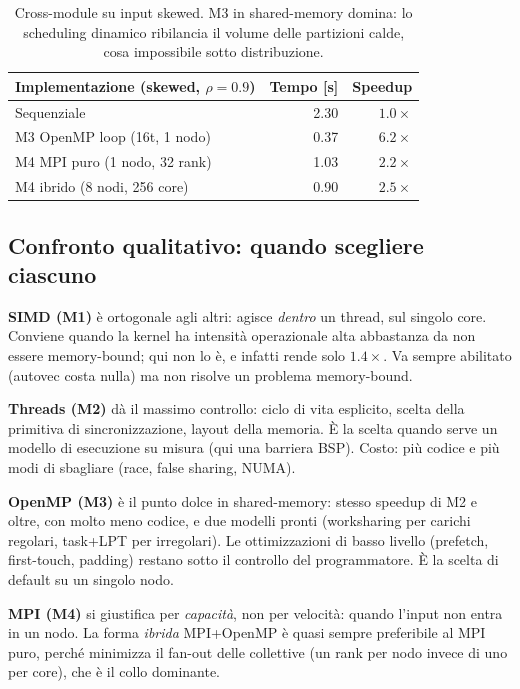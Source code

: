 \documentclass[11pt,a4paper]{article}
\theoremstyle{remark}
\begin{document}
\begin{table}[H]
\centering\small
\begin{tabular}{@{}lrr@{}}
\toprule
Implementazione (skewed, $\rho{=}0.9$) & Tempo [s] & Speedup \\
\midrule
Sequenziale                      & 2.30 & $1.0\times$ \\
M3 OpenMP loop (16t, 1 nodo)     & 0.37 & $6.2\times$ \\
M4 MPI puro (1 nodo, 32 rank)    & 1.03 & $2.2\times$ \\
M4 ibrido (8 nodi, 256 core)     & 0.90 & $2.5\times$ \\
\bottomrule
\end{tabular}
\caption{Cross-module su input skewed. M3 in shared-memory domina: lo scheduling dinamico ribilancia il volume delle partizioni calde, cosa impossibile sotto distribuzione.}
\label{tab:xmod-skew}
\end{table}

\subsection{Confronto qualitativo: quando scegliere ciascuno}

\textbf{SIMD (M1)} \`e ortogonale agli altri: agisce \emph{dentro} un thread, sul singolo core. Conviene quando la kernel ha intensit\`a operazionale alta abbastanza da non essere memory-bound; qui non lo \`e, e infatti rende solo $1.4\times$. Va sempre abilitato (autovec costa nulla) ma non risolve un problema memory-bound.

\textbf{Threads (M2)} d\`a il massimo controllo: ciclo di vita esplicito, scelta della primitiva di sincronizzazione, layout della memoria. \`E la scelta quando serve un modello di esecuzione su misura (qui una barriera BSP). Costo: pi\`u codice e pi\`u modi di sbagliare (race, false sharing, NUMA).

\textbf{OpenMP (M3)} \`e il punto dolce in shared-memory: stesso speedup di M2 e oltre, con molto meno codice, e due modelli pronti (worksharing per carichi regolari, task+LPT per irregolari). Le ottimizzazioni di basso livello (prefetch, first-touch, padding) restano sotto il controllo del programmatore. \`E la scelta di default su un singolo nodo.

\textbf{MPI (M4)} si giustifica per \emph{capacit\`a}, non per velocit\`a: quando l'input non entra in un nodo. La forma \emph{ibrida} MPI+OpenMP \`e quasi sempre preferibile al MPI puro, perch\'e minimizza il fan-out delle collettive (un rank per nodo invece di uno per core), che \`e il collo dominante.
\end{document}

